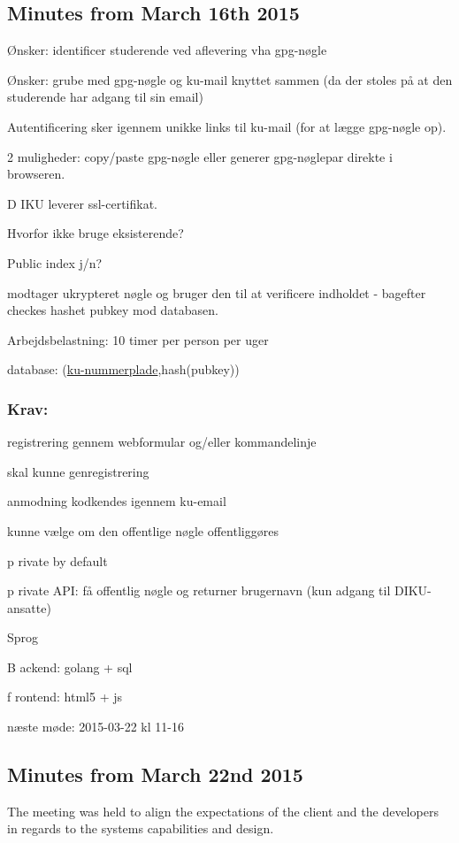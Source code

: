 \documentclass[11pt,a4paper]{report}
\let\OldItem\item
\newcommand{\SubItemStart}[1]{%
    \let\item\SubItemEnd
    \begin{SubItemList}[resume]%
        \OldItem #1%
}
\newcommand{\SubItemMiddle}[1]{%
    \OldItem #1%
}
\newcommand{\SubItemEnd}[1]{%
    \end{SubItemList}%
    \let\item\OldItem
    \item #1%
}
\newcommand*{\SubItem}[1]{%
    \let\SubItem\SubItemMiddle%
    \SubItemStart{#1}%
}%
\begin{document}
\subsection{Minutes from March 16th 2015}
\begin{itemize}
\item Ønsker: identificer studerende ved aflevering vha gpg-nøgle
\item Ønsker: grube med gpg-nøgle og ku-mail knyttet sammen (da der stoles på at den studerende har adgang til sin email)
\item Autentificering sker igennem unikke links til ku-mail (for at lægge gpg-nøgle op).
\SubItem 2 muligheder: copy/paste gpg-nøgle eller generer gpg-nøglepar direkte i browseren.
\item DIKU leverer ssl-certifikat.
\item Hvorfor ikke bruge eksisterende?
\item Public index j/n?
\item modtager ukrypteret nøgle og bruger den til at verificere indholdet - bagefter checkes hashet pubkey mod databasen.
\item Arbejdsbelastning: 10 timer per person per uger
\item database: (\underline{ku-nummerplade},hash(pubkey))
\end{itemize}
\subsubsection{Krav:}
\begin{itemize}
\item registrering gennem webformular og/eller kommandelinje
\item skal kunne genregistrering
\item anmodning kodkendes igennem ku-email
\item kunne vælge om den offentlige nøgle offentliggøres
\SubItem private by default
\item private API: få offentlig nøgle og returner brugernavn (kun adgang til DIKU-ansatte)
\item Sprog
\SubItem Backend: golang + sql
\SubItem frontend: html5 + js
\end{itemize}

næste møde:
2015-03-22 kl 11-16

\subsection{Minutes from March 22nd 2015}
The meeting was held to align the expectations of the client and the developers in regards to the systems capabilities and design.
\end{document}
